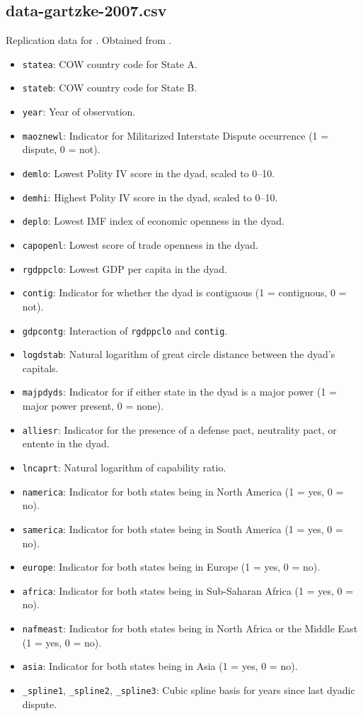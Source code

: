 \documentclass[12pt]{article}
\begin{document}
\subsection{data-gartzke-2007.csv}

Replication data for \citet{gartzke2007}.
Obtained from \citet{gartzke2007data}.

\begin{itemize}
  \item \texttt{statea}: COW country code for State A.
  \item \texttt{stateb}: COW country code for State B.
  \item \texttt{year}: Year of observation.
  \item \texttt{maoznewl}: Indicator for Militarized Interstate Dispute occurrence (1 = dispute, 0 = not).
  \item \texttt{demlo}: Lowest Polity IV score in the dyad, scaled to 0--10.
  \item \texttt{demhi}: Highest Polity IV score in the dyad, scaled to 0--10.
  \item \texttt{deplo}: Lowest IMF index of economic openness in the dyad.
  \item \texttt{capopenl}: Lowest score of trade openness in the dyad.
  \item \texttt{rgdppclo}: Lowest GDP per capita in the dyad.
  \item \texttt{contig}: Indicator for whether the dyad is contiguous (1 = contiguous, 0 = not).
  \item \texttt{gdpcontg}: Interaction of \texttt{rgdppclo} and \texttt{contig}.
  \item \texttt{logdstab}: Natural logarithm of great circle distance between the dyad's capitals.
  \item \texttt{majpdyds}: Indicator for if either state in the dyad is a major power (1 = major power present, 0 = none).
  \item \texttt{alliesr}: Indicator for the presence of a defense pact, neutrality pact, or entente in the dyad.  
  \item \texttt{lncaprt}: Natural logarithm of capability ratio.
  \item \texttt{namerica}: Indicator for both states being in North America (1 = yes, 0 = no).
  \item \texttt{samerica}: Indicator for both states being in South America (1 = yes, 0 = no).
  \item \texttt{europe}: Indicator for both states being in Europe (1 = yes, 0 = no).
  \item \texttt{africa}: Indicator for both states being in Sub-Saharan Africa (1 = yes, 0 = no).
  \item \texttt{nafmeast}: Indicator for both states being in North Africa or the Middle East (1 = yes, 0 = no).
  \item \texttt{asia}: Indicator for both states being in Asia (1 = yes, 0 = no).
  \item \texttt{\_spline1}, \texttt{\_spline2}, \texttt{\_spline3}: Cubic spline basis for years since last dyadic dispute.
\end{itemize}
\end{document}

